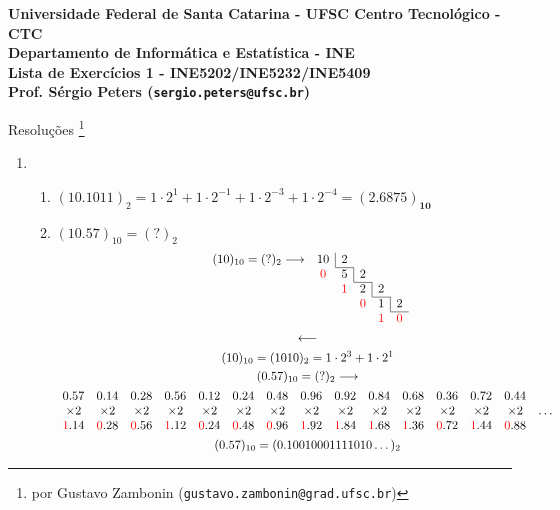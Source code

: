 \documentclass{article}
\newcommand\divr[1]{\multicolumn{1}{c|}{#1}}
\newcommand\redn[1]{\textcolor{red}{#1}}
\newenvironment{arabenum}{
    \begin{enumerate}[label=\textbf{\arabic*})]
}{
    \end{enumerate}
}
\newenvironment{alphenum}{
    \begin{enumerate}[label=(\alph*)]
}{
    \end{enumerate}
}
\begin{document}
{\bf \noindent Universidade Federal de Santa Catarina - UFSC
Centro Tecnológico - CTC \\
Departamento de Informática e Estatística - INE \\

\noindent Lista de Exercícios 1 - INE5202/INE5232/INE5409 \\
Prof. Sérgio Peters (\verb!sergio.peters@ufsc.br!)

\begin{center} Resoluções
\footnote{por Gustavo Zambonin (\texttt{gustavo.zambonin@grad.ufsc.br})}
\end{center}}

\begin{arabenum}

\item \begin{alphenum}

\item $(10.1011)_2 = 1 \cdot 2^1 + 1 \cdot 2^{-1} + 1 \cdot 2^{-3} +
1 \cdot 2^{-4} = \boldsymbol{(2.6875)_{10}}$

\item $(10.57)_{10} = (?)_2$
\begin{gather*}
\begin{array}{*{7}c}
(10)_{10} = (?)_2 \longrightarrow & \divr{10} & 2            \\ \cline{3-3}
                                  & \redn{0}  & \divr{5} & 2 \\ \cline{4-4}
&                                 & \redn{1}  & \divr{2} & 2 \\ \cline{5-5}
& &                               & \redn{0}  & \divr{1} & 2 \\ \cline{6-6}
& & &                             & \redn{1}  & \redn{0}
\end{array} \\
\longleftarrow \\
(10)_{10} = (1010)_2 = 1 \cdot 2^3 + 1 \cdot 2^1 \\
(0.57)_{10} = (?)_2 \longrightarrow \\
\begin{array}{*{15}c}
0.57 & 0.14 & 0.28 & 0.56 & 0.12 &
0.24 & 0.48 & 0.96 & 0.92 & 0.84 &
0.68 & 0.36 & 0.72 & 0.44 \\
\times 2 & \times 2 & \times 2 & \times 2 & \times 2 &
\times 2 & \times 2 & \times 2 & \times 2 & \times 2 &
\times 2 & \times 2 & \times 2 & \times 2 & \dots \\
\redn{1}.14 & \redn{0}.28 & \redn{0}.56 & \redn{1}.12 & \redn{0}.24 &
\redn{0}.48 & \redn{0}.96 & \redn{1}.92 & \redn{1}.84 & \redn{1}.68 &
\redn{1}.36 & \redn{0}.72 & \redn{1}.44 & \redn{0}.88
\end{array} \\
(0.57)_{10} = (0.10010001111010 \dots)_2
\end{gather*}


\end{alphenum}
\end{arabenum}
\end{document}
